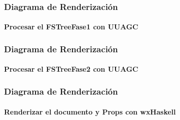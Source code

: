 \documentclass[12pt]{beamer}
\begin{document}
\begin{frame}
\frametitle{Diagrama de Renderización}
\framesubtitle{Procesar el FSTreeFase1 con UUAGC}
\end{frame}

\begin{frame}
\frametitle{Diagrama de Renderización}
\framesubtitle{Procesar el FSTreeFase2 con UUAGC}
\end{frame}

\begin{frame}
\frametitle{Diagrama de Renderización}
\framesubtitle{Renderizar el documento y Props con wxHaskell}
\end{frame}
\end{document}
